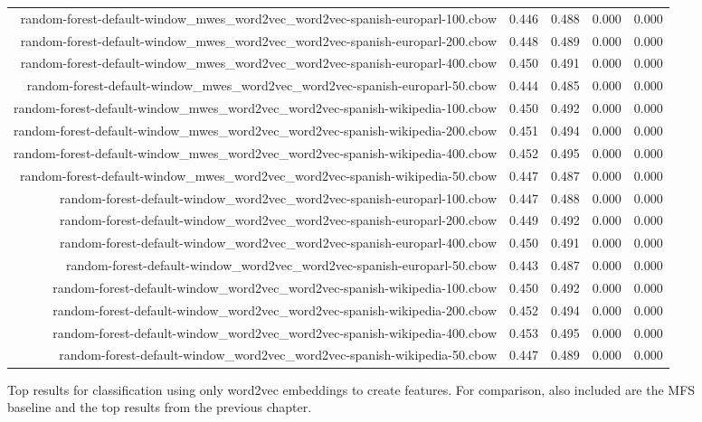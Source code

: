 \begin{figure*}
\begin{centering}
\begin{tabulary}{\textwidth}{|R|L|L|L|L|}
random-forest-default-window_mwes_word2vec_word2vec-spanish-europarl-100.cbow & 0.446 & 0.488 & 0.000 & 0.000 \\
random-forest-default-window_mwes_word2vec_word2vec-spanish-europarl-200.cbow & 0.448 & 0.489 & 0.000 & 0.000 \\
random-forest-default-window_mwes_word2vec_word2vec-spanish-europarl-400.cbow & 0.450 & 0.491 & 0.000 & 0.000 \\
random-forest-default-window_mwes_word2vec_word2vec-spanish-europarl-50.cbow & 0.444 & 0.485 & 0.000 & 0.000 \\
random-forest-default-window_mwes_word2vec_word2vec-spanish-wikipedia-100.cbow & 0.450 & 0.492 & 0.000 & 0.000 \\
random-forest-default-window_mwes_word2vec_word2vec-spanish-wikipedia-200.cbow & 0.451 & 0.494 & 0.000 & 0.000 \\
random-forest-default-window_mwes_word2vec_word2vec-spanish-wikipedia-400.cbow & 0.452 & 0.495 & 0.000 & 0.000 \\
random-forest-default-window_mwes_word2vec_word2vec-spanish-wikipedia-50.cbow & 0.447 & 0.487 & 0.000 & 0.000 \\
random-forest-default-window_word2vec_word2vec-spanish-europarl-100.cbow & 0.447 & 0.488 & 0.000 & 0.000 \\
random-forest-default-window_word2vec_word2vec-spanish-europarl-200.cbow & 0.449 & 0.492 & 0.000 & 0.000 \\
random-forest-default-window_word2vec_word2vec-spanish-europarl-400.cbow & 0.450 & 0.491 & 0.000 & 0.000 \\
random-forest-default-window_word2vec_word2vec-spanish-europarl-50.cbow & 0.443 & 0.487 & 0.000 & 0.000 \\
random-forest-default-window_word2vec_word2vec-spanish-wikipedia-100.cbow & 0.450 & 0.492 & 0.000 & 0.000 \\
random-forest-default-window_word2vec_word2vec-spanish-wikipedia-200.cbow & 0.452 & 0.494 & 0.000 & 0.000 \\
random-forest-default-window_word2vec_word2vec-spanish-wikipedia-400.cbow & 0.453 & 0.495 & 0.000 & 0.000 \\
random-forest-default-window_word2vec_word2vec-spanish-wikipedia-50.cbow & 0.447 & 0.489 & 0.000 & 0.000 \\

    \hline
  \end{tabulary}
  \end{centering}
  \caption{Top results for classification using only word2vec embeddings to
  create features. For comparison, also included are the MFS baseline and the
  top results from the previous chapter.}
  \label{fig:word2vec-alone-results-cbow}
\end{figure*}

